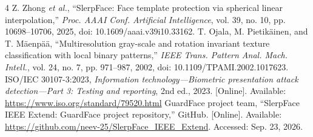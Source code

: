 \documentclass[conference,10pt]{IEEEtran}
\begin{document}
\begin{thebibliography}{4}
 Z. Zhong \emph{et al.}, ``SlerpFace: Face template protection via spherical linear interpolation,'' \emph{Proc. AAAI Conf. Artificial Intelligence}, vol. 39, no. 10, pp. 10698--10706, 2025, doi: 10.1609/aaai.v39i10.33162.
 T. Ojala, M. Pietik\"ainen, and T. M\"aenp\"a\"a, ``Multiresolution gray-scale and rotation invariant texture classification with local binary patterns,'' \emph{IEEE Trans. Pattern Anal. Mach. Intell.}, vol. 24, no. 7, pp. 971--987, 2002, doi: 10.1109/TPAMI.2002.1017623.
 ISO/IEC 30107-3:2023, \emph{Information technology---Biometric presentation attack detection---Part 3: Testing and reporting}, 2nd ed., 2023. [Online]. Available: \url{https://www.iso.org/standard/79520.html}
 GuardFace project team, ``SlerpFace IEEE Extend: GuardFace project repository,'' GitHub. [Online]. Available: \url{https://github.com/neev-25/SlerpFace_IEEE_Extend}. Accessed: Sep. 23, 2026.
\end{thebibliography}
\end{document}
